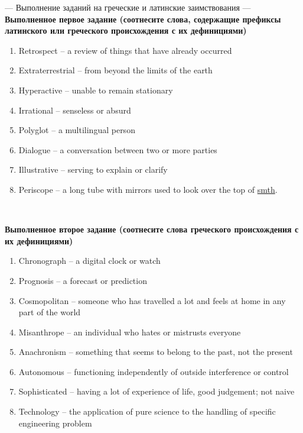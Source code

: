 \documentclass[main.tex]{subfiles}
\begin{document}


--- Выполнение заданий на греческие и латинские заимствования ---
\\

\textbf{Выполненное первое задание (соотнесите слова, содержащие префиксы латинского или греческого происхождения с их дефинициями)}

\begin{enumerate}[nosep]
	\item Retrospect -- a review of things that have already occurred
	\item Extraterrestrial -- from beyond the limits of the earth
	\item Hyperactive -- unable to remain stationary
	\item Irrational -- senseless or absurd
	\item Polyglot -- a multilingual person
	\item Dialogue -- a conversation between two or more parties
	\item Illustrative -- serving to explain or clarify
	\item Periscope -- a long tube with mirrors used to look over the top of \underline{smth}.
\end{enumerate}
\ 

\textbf{Выполненное второе задание (соотнесите слова греческого происхождения с их дефинициями)}

\begin{enumerate}[nosep]
	\item Chronograph -- a digital clock or watch
	\item Prognosis -- a forecast or prediction
	\item Cosmopolitan -- someone who has travelled a lot and feels at home in any part of the world
	\item Misanthrope -- an individual who hates or mistrusts everyone
	\item Anachronism -- something that seems to belong to the past, not the present
	\item Autonomous -- functioning independently of outside interference or control
	\item Sophisticated -- having a lot of experience of life, good judgement; not naive
	\item Technology -- the application of pure science to the handling of specific engineering problem
\end{enumerate}
\ 
\end{document}

